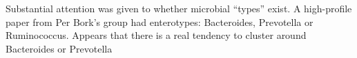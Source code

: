 Substantial attention was given to whether microbial ``types'' exist.
A high-profile paper from Per Bork's group had enterotypes: Bacteroides, Prevotella or Ruminococcus.
\cite{arumugam2011enterotypes}
Appears that there is a real tendency to cluster around Bacteroides or Prevotella \cite{wu2011linking}





